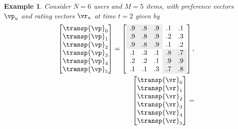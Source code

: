 \documentclass{article}
\newtheorem{example}{Example}
\newcommand\vocrating{\vr}
\begin{document}
\begin{example}
\newcommand\cg{\cellcolor{gray!15}}
Consider $N=6$ users and $M=5$ items, with preference vectors $\vp_u$
and rating vectors $\vocrating_u$ at time $t=2$ given by 
\begin{align*}
\begin{bmatrix}
\transp{\vp}_0 \\
\transp{\vp}_1 \\
\transp{\vp}_2 \\
\transp{\vp}_3 \\
\transp{\vp}_4 \\
\transp{\vp}_5 
\end{bmatrix}
=
\left[
\begin{array}{ccccc}
\cg .9 & \cg .8 & \cg .9 & .1 & .1 \\
\cg .9 & \cg .8 & \cg .9 & .2 & .3 \\
\cg .9 & \cg .8 & \cg .9 & .1 & .2 \\
.1 & .3 & .1 & \cg .8 & \cg .7 \\
.2 & .2 & .1 & \cg .9 & \cg .9 \\
.1 & .1 & .3 & \cg .7 & \cg.8 \\
\end{array}
\right], \\
\begin{bmatrix}
\transp{\vocrating}_0 \\
\transp{\vocrating}_1 \\
\transp{\vocrating}_2 \\
\transp{\vocrating}_3 \\
\transp{\vocrating}_4 \\
\transp{\vocrating}_5 
\end{bmatrix}
=

\end{align*}
\end{example}
\end{document}
